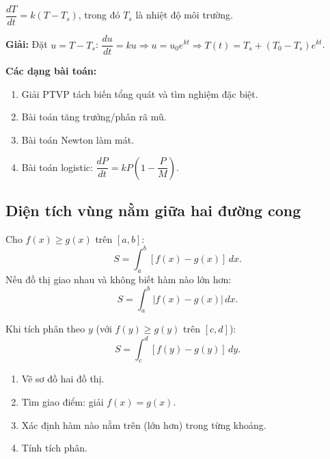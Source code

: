 \documentclass[12pt,a4paper]{article}
\begin{document}
\begin{vidu}[title={Phương trình Newton về làm mát}]
  $\dfrac{dT}{dt} = k(T - T_s)$, trong đó $T_s$ là nhiệt độ môi trường.

  \medskip\textbf{Giải:}
  Đặt $u = T - T_s$: $\dfrac{du}{dt} = ku \Rightarrow u = u_0 e^{kt} \Rightarrow T(t) = T_s + (T_0 - T_s)e^{kt}$.
\end{vidu}

\medskip\noindent\textbf{Các dạng bài toán:}
\begin{enumerate}[label=\textbf{Dạng \arabic*:}, leftmargin=*, align=left]
  \item Giải PTVP tách biến tổng quát và tìm nghiệm đặc biệt.
  \item Bài toán tăng trưởng/phân rã mũ.
  \item Bài toán Newton làm mát.
  \item Bài toán logistic: $\dfrac{dP}{dt} = kP\!\left(1 - \dfrac{P}{M}\right)$.
\end{enumerate}

\subsection{Diện tích vùng nằm giữa hai đường cong}

\begin{congthuc}[title={Diện tích giữa hai đồ thị theo trục $x$}]
  Cho $f(x) \ge g(x)$ trên $[a, b]$:
  \[
    S = \int_a^b [f(x) - g(x)]\,dx.
  \]
  Nếu đồ thị giao nhau và không biết hàm nào lớn hơn:
  \[
    S = \int_a^b |f(x) - g(x)|\,dx.
  \]
\end{congthuc}

\begin{congthuc}[title={Diện tích theo trục $y$ (hàm theo $y$)}]
  Khi tích phân theo $y$ (với $f(y) \ge g(y)$ trên $[c, d]$):
  \[
    S = \int_c^d [f(y) - g(y)]\,dy.
  \]
\end{congthuc}

\begin{phuongphap}[title={Các bước tính diện tích giữa hai đường cong}]
  \begin{enumerate}
    \item Vẽ sơ đồ hai đồ thị.
    \item Tìm giao điểm: giải $f(x) = g(x)$.
    \item Xác định hàm nào nằm trên (lớn hơn) trong từng khoảng.
    \item Tính tích phân.
  \end{enumerate}
\end{phuongphap}
\end{document}
